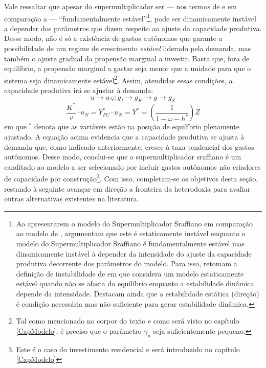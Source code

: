 Vale ressaltar que apesar do supermultiplicador ser --- nos termos de \textcite{hicks_capital_1965} e em comparação a \textcite{harrod_essay_1939} --- ``fundamentalmente estável''\footnote{
	Ao apresentarem o modelo do Supermultiplicador Sraffiano em comparação ao modelo de \textcite{harrod_essay_1939}, \textcite{serrano_trouble_2017} argumentam que este é estaticamente instável enquanto o modelo do Supermultiplicador Sraffiano é fundamentalmente estável mas dinamicamente instável à depender da intensidade do ajuste da capacidade produtiva decorrente dos parâmetros do modelo.
	Para isso, retomam a definição de instabilidade de \textcite{hicks_contribution_1972} em que considera um modelo estaticamente estável quando não se afasta do equilíbrio enquanto a estabilidade dinâmica depende da intensidade. Destacam ainda que a estabilidade estática (direção) é condição necessária mas não suficiente para gerar estabilidade dinâmica.
}, pode ser dinamicamente instável a depender dos parâmetros que dizem respeito ao ajuste da capacidade produtiva. Desse modo, não é só a existência de gastos autônomos que garante a possibilidade de um regime de crescimento \textit{estável} liderado pela demanda, mas também o ajuste gradual da propensão marginal a investir. Basta que, fora de equilíbrio, a propensão marginal a gastar seja menor que a unidade para que o sistema seja dinamicamente estável\footnote{Tal como mencionado no corpor do texto e como será visto no capítulo \ref{CapModelo}, é preciso que o parâmetro $\gamma_u$ seja suficientemente pequeno.}. Assim, atendidas essas condições, a capacidade produtiva irá se ajustar à demanda:
$$
u \to u_N : g_I \to g_K \to g \to  g_Z
$$
$$
\frac{K^*}{v}\cdot u_N = Y_{FC}^*\cdot u_N = Y^* = \left(\frac{1}{1 - \omega - h^*}\right)Z
$$
em que $^*$ denota que as variáveis estão na posição de equilíbrio plenamente ajustado.
A equação acima evidencia que a capacidade produtiva se ajusta à demanda que, como indicado anteriormente, cresce à taxa tendencial dos gastos autônomos. 
Desse modo, conclui-se que o supermultiplicador sraffiano é um canditado ao modelo a ser selecionado por incluir gastos autônomos não criadores de capacidade por construção\footnote{
	Este é o caso do investimento residencial e será introduzido no capítulo \ref{CapModelo} 
}.
Com isso, completam-se os objetivos desta seção, restando à seguinte avançar em direção a fronteira da heterodoxia para avaliar outras alternativas existentes na literatura.





